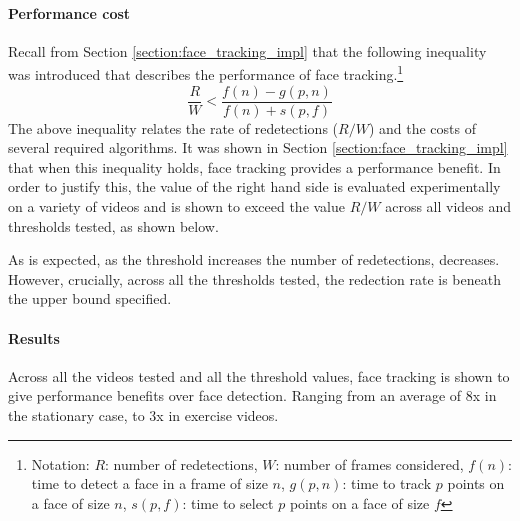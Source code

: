 \paragraph{Performance cost}
Recall from Section \ref{section:face_tracking_impl} that the following inequality was introduced that describes the performance of face tracking.\footnote{Notation: $R$: number of redetections, $W$: number of frames considered, $f(n)$: time to detect a face in a frame of size $n$, $g(p,n)$: time to track $p$ points on a face of size $n$, $s(p,f)$: time to select $p$ points on a face of size $f$}
\begin{equation*}
    \frac{R}{W} < \frac{f(n)-g(p,n)}{f(n)+s(p,f)}
\end{equation*}
The above inequality relates the rate of redetections ($R/W$) and the costs of several required algorithms. It was shown in Section \ref{section:face_tracking_impl} that when this inequality holds, face tracking provides a performance benefit.
In order to justify this, the value of the right hand side is evaluated experimentally on a variety of videos and is shown to exceed the value $R/W$ across all videos and thresholds tested, as shown below.
\begin{figure}[H]
    \centering
    \quad
\end{figure}
\noindent
As is expected, as the threshold increases the number of redetections, decreases. However, crucially, across all the thresholds tested, the redection rate is beneath the upper bound specified.





\paragraph{Results}
Across all the videos tested and all the threshold values, face tracking is shown to give performance benefits over face detection.
Ranging from an average of 8x in the stationary case, to 3x in exercise videos.

